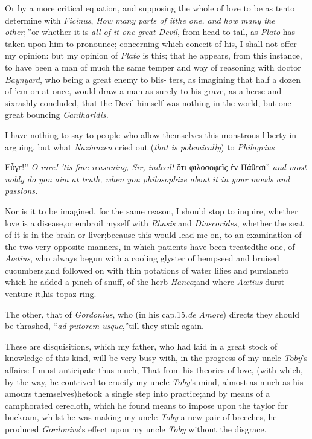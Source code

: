 \documentclass{article}
\begin{document}
\tsh Or by a more critical equation, and supposing the
whole of love to be as ten\tsh to determine with
\textit{Ficinus},\break
\lqq\textit{How many parts of it\tsk the one,\tsk
and}
\lqq \textit{how many the other};\,”\tsk or whether it
is \textit{all of it one great Devil}, from head to tail, as
\textit{Plato} has taken upon him to pronounce; concerning which
conceit of his, I shall not offer my opinion:\break
\tsk but my opinion of \textit{Plato} is this; that
he appears, from this instance, to have been a man of much the same
temper and way of reasoning with doctor \textit{Baynyard},
who being a great enemy to blis-\break
ters, as imagining that half a dozen of\break
’em on at once, would draw a man as surely to his grave, as a
herse and six\tsk rashly concluded, that the Devil himself was
nothing in the world, but one great bouncing
\textit{Cantharidis.}\tsh

I have nothing to say to people who allow themselves this
monstrous liberty in arguing, but what \textit{Nazianzen} cried out
(\textit{that is polemically}) to
\textit{Philagrius}\tsh

\indent\lqq Εὖγε!” \textit{O rare! ’tis fine reasoning, Sir, indeed!}\tsk
\lqq ὅτι φιλοσοφεῖς ἐν Πάθεσι”
\tsk \textit{and most nobly do you aim at truth, when you philosophize about
it in your moods and passions.}

Nor is it to be imagined, for the same reason, I should stop to
inquire, whether love is a disease,\tsh or embroil myself
with \textit{Rhasis} and \textit{Dioscorides}, whether the seat of it
is in the brain or liver;\tsk because this would lead me on, to
an examination of the two very opposite manners, in
which patients have been treated\tsh the one, of
\textit{Aœtius}, who always begun with a cooling glyster of
hempseed and bruised cucumbers;\tsk and followed on with thin
potations of water lilies and purslane\tsk to which he added a
pinch of snuff, of the herb \textit{Hanea};\tsk and where
\textit{Aœtius} durst venture it,\tsk his\break
topaz-ring.

\tsh The other, that of \textit{Gordonius}, who (in his
cap.\@ 15.\@ \textit{de Amore}) directs they should be thrashed,
“\textit{ad putorem usque},”\tsh till they stink
again.

These are disquisitions, which my father, who had laid in a great
stock of knowledge of this kind, will be very busy with, in the
progress of my uncle\break
\textit{Toby}’s affairs: I must anticipate thus much, That from his theories of
love, (with which, by the way, he contrived to crucify my uncle \textit{Toby}’s
mind, almost as much as his amours themselves)\tsk he\break took a single step into
practice;\tsk and by means of a camphorated cerecloth, which he found means to
impose upon the taylor for buckram, whilst he was making my uncle \textit{Toby} a
new pair of breeches, he produced \textit{Gordonius}’s effect upon my uncle
\textit{Toby} without the disgrace.
\end{document}
